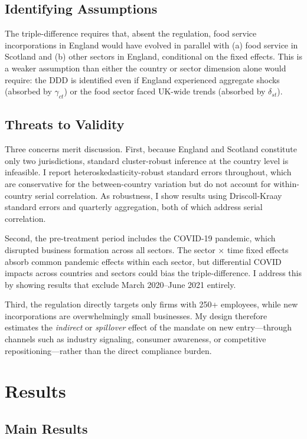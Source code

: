 \documentclass[12pt]{article}
\begin{document}
\subsection{Identifying Assumptions}

The triple-difference requires that, absent the regulation, food service incorporations in England would have evolved in parallel with (a) food service in Scotland and (b) other sectors in England, conditional on the fixed effects. This is a weaker assumption than either the country or sector dimension alone would require: the DDD is identified even if England experienced aggregate shocks (absorbed by $\gamma_{ct}$) or the food sector faced UK-wide trends (absorbed by $\delta_{st}$).

\subsection{Threats to Validity}

Three concerns merit discussion. First, because England and Scotland constitute only two jurisdictions, standard cluster-robust inference at the country level is infeasible. I report heteroskedasticity-robust standard errors throughout, which are conservative for the between-country variation but do not account for within-country serial correlation. As robustness, I show results using Driscoll-Kraay standard errors and quarterly aggregation, both of which address serial correlation.

Second, the pre-treatment period includes the COVID-19 pandemic, which disrupted business formation across all sectors. The sector $\times$ time fixed effects absorb common pandemic effects within each sector, but differential COVID impacts across countries and sectors could bias the triple-difference. I address this by showing results that exclude March 2020--June 2021 entirely.

Third, the regulation directly targets only firms with 250+ employees, while new incorporations are overwhelmingly small businesses. My design therefore estimates the \textit{indirect} or \textit{spillover} effect of the mandate on new entry---through channels such as industry signaling, consumer awareness, or competitive repositioning---rather than the direct compliance burden.

\section{Results}

\subsection{Main Results}
\end{document}
